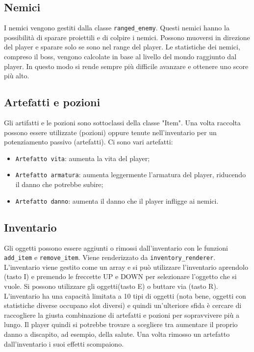\documentclass{article}
\begin{document}
\subsection{Nemici}
I nemici vengono gestiti dalla classe \verb|ranged_enemy|.
Questi nemici hanno la possibilità di sparare proiettili e di colpire i nemici. 
Possono muoversi in direzione del player e sparare solo se sono nel range del player.
Le statistiche dei nemici, compreso il boss, vengono calcolate in base al livello del mondo raggiunto dal player. In questo modo si rende sempre più difficile avanzare e ottenere uno score più alto.

\subsection{Artefatti e pozioni}
Gli artifatti e le pozioni sono sottoclassi della classe "Item". Una volta raccolta possono essere utilizzate (pozioni) oppure tenute nell'inventario per un potenziamento passivo (artefatti).
Ci sono vari artefatti:
 \begin{itemize}
     \item \verb|Artefatto vita|: aumenta la vita del player;
     \item \verb|Artefatto armatura|: aumenta leggermente l'armatura del player, riducendo il danno che potrebbe subire;
     \item \verb|Artefatto danno|: aumenta il danno che il player infligge ai nemici.
 \end{itemize}
 
 \subsection{Inventario}
 Gli oggetti possono essere aggiunti o rimossi dall'inventario con le funzioni \verb|add_item| e \verb|remove_item|. 
 Viene renderizzato da \verb|inventory_renderer|.
 L'inventario viene gestito come un array e si può utilizzare l'inventario aprendolo (tasto I) e premendo le freccette UP e DOWN per selezionare l'oggetto che si vuole.
 Si possono utilizzare gli oggetti(tasto E) o buttare via (tasto R).
 L'inventario ha una capacità limitata a 10 tipi di oggetti (nota bene, oggetti con statistiche diverse occupano slot diversi) e quindi un'ulteriore sfida è cercare di raccogliere la giusta combinazione di artefatti e pozioni per sopravvivere più a lungo. Il player quindi si potrebbe trovare a scegliere tra aumentare il proprio danno a discapito, ad esempio, della salute. Una volta rimosso un artefatto dall'inventario i suoi effetti scompaiono.
\end{document}
